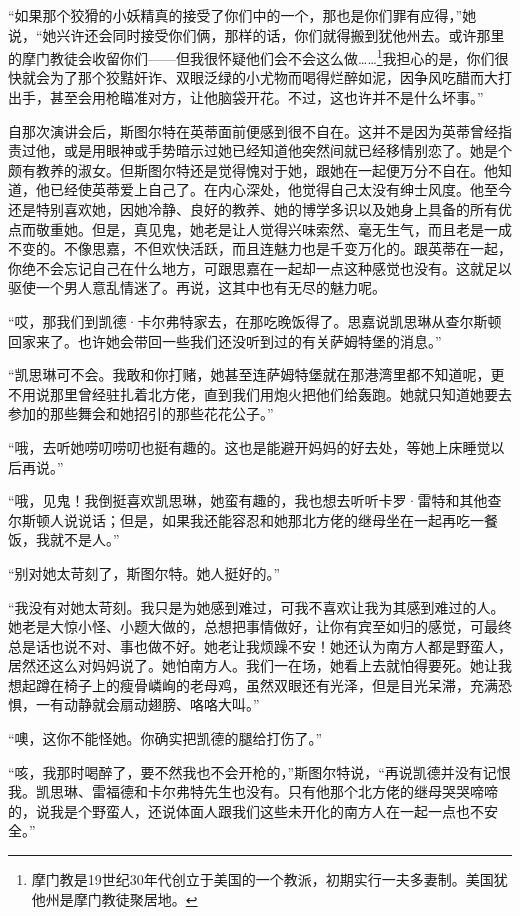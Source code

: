 \par “如果那个狡猾的小妖精真的接受了你们中的一个，那也是你们罪有应得，”她说，“她兴许还会同时接受你们俩，那样的话，你们就得搬到犹他州去。或许那里的摩门教徒会收留你们——但我很怀疑他们会不会这么做……\footnote{摩门教是19世纪30年代创立于美国的一个教派，初期实行一夫多妻制。美国犹他州是摩门教徒聚居地。}我担心的是，你们很快就会为了那个狡黠奸诈、双眼泛绿的小尤物而喝得烂醉如泥，因争风吃醋而大打出手，甚至会用枪瞄准对方，让他脑袋开花。不过，这也许并不是什么坏事。”
\par 自那次演讲会后，斯图尔特在英蒂面前便感到很不自在。这并不是因为英蒂曾经指责过他，或是用眼神或手势暗示过她已经知道他突然间就已经移情别恋了。她是个颇有教养的淑女。但斯图尔特还是觉得愧对于她，跟她在一起便万分不自在。他知道，他已经使英蒂爱上自己了。在内心深处，他觉得自己太没有绅士风度。他至今还是特别喜欢她，因她冷静、良好的教养、她的博学多识以及她身上具备的所有优点而敬重她。但是，真见鬼，她老是让人觉得兴味索然、毫无生气，而且老是一成不变的。不像思嘉，不但欢快活跃，而且连魅力也是千变万化的。跟英蒂在一起，你绝不会忘记自己在什么地方，可跟思嘉在一起却一点这种感觉也没有。这就足以驱使一个男人意乱情迷了。再说，这其中也有无尽的魅力呢。
\par “哎，那我们到凯德·卡尔弗特家去，在那吃晚饭得了。思嘉说凯思琳从查尔斯顿回家来了。也许她会带回一些我们还没听到过的有关萨姆特堡的消息。”
\par “凯思琳可不会。我敢和你打赌，她甚至连萨姆特堡就在那港湾里都不知道呢，更不用说那里曾经驻扎着北方佬，直到我们用炮火把他们给轰跑。她就只知道她要去参加的那些舞会和她招引的那些花花公子。”
\par “哦，去听她唠叨唠叨也挺有趣的。这也是能避开妈妈的好去处，等她上床睡觉以后再说。”
\par “哦，见鬼！我倒挺喜欢凯思琳，她蛮有趣的，我也想去听听卡罗·雷特和其他查尔斯顿人说说话；但是，如果我还能容忍和她那北方佬的继母坐在一起再吃一餐饭，我就不是人。”
\par “别对她太苛刻了，斯图尔特。她人挺好的。”
\par “我没有对她太苛刻。我只是为她感到难过，可我不喜欢让我为其感到难过的人。她老是大惊小怪、小题大做的，总想把事情做好，让你有宾至如归的感觉，可最终总是话也说不对、事也做不好。她老让我烦躁不安！她还认为南方人都是野蛮人，居然还这么对妈妈说了。她怕南方人。我们一在场，她看上去就怕得要死。她让我想起蹲在椅子上的瘦骨嶙峋的老母鸡，虽然双眼还有光泽，但是目光呆滞，充满恐惧，一有动静就会扇动翅膀、咯咯大叫。”
\par “噢，这你不能怪她。你确实把凯德的腿给打伤了。”
\par “咳，我那时喝醉了，要不然我也不会开枪的，”斯图尔特说，“再说凯德并没有记恨我。凯思琳、雷福德和卡尔弗特先生也没有。只有他那个北方佬的继母哭哭啼啼的，说我是个野蛮人，还说体面人跟我们这些未开化的南方人在一起一点也不安全。”
